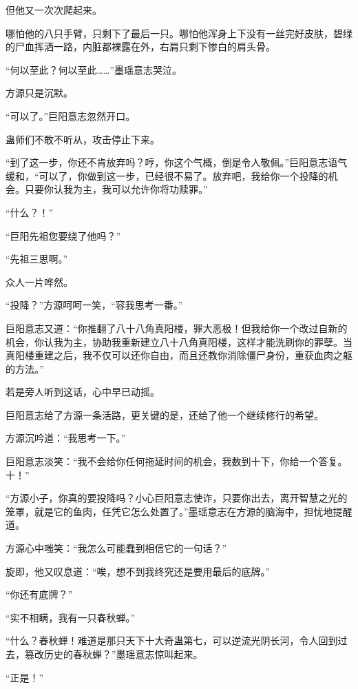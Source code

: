 \begin{this_body}
但他又一次次爬起来。

哪怕他的八只手臂，只剩下了最后一只。哪怕他浑身上下没有一丝完好皮肤，碧绿的尸血挥洒一路，内脏都裸露在外，右肩只剩下惨白的肩头骨。

“何以至此？何以至此……”墨瑶意志哭泣。

方源只是沉默。

“可以了。”巨阳意志忽然开口。

蛊师们不敢不听从，攻击停止下来。

“到了这一步，你还不肯放弃吗？哼，你这个气概，倒是令人敬佩。”巨阳意志语气缓和，“可以了，你做到这一步，已经很不易了。放弃吧，我给你一个投降的机会。只要你认我为主，我可以允许你将功赎罪。”

“什么？！”

“巨阳先祖您要绕了他吗？”

“先祖三思啊。”

众人一片哗然。

“投降？”方源呵呵一笑，“容我思考一番。”

巨阳意志又道：“你推翻了八十八角真阳楼，罪大恶极！但我给你一个改过自新的机会，你认我为主，协助我重新建立八十八角真阳楼，这样才能洗刷你的罪孽。当真阳楼重建之后，我不仅可以还你自由，而且还教你消除僵尸身份，重获血肉之躯的方法。”

若是旁人听到这话，心中早已动摇。

巨阳意志给了方源一条活路，更关键的是，还给了他一个继续修行的希望。

方源沉吟道：“我思考一下。”

巨阳意志淡笑：“我不会给你任何拖延时间的机会，我数到十下，你给一个答复。十！”

“方源小子，你真的要投降吗？小心巨阳意志使诈，只要你出去，离开智慧之光的笼罩，就是它的鱼肉，任凭它怎么处置了。”墨瑶意志在方源的脑海中，担忧地提醒道。

方源心中嗤笑：“我怎么可能蠢到相信它的一句话？”

旋即，他又叹息道：“唉，想不到我终究还是要用最后的底牌。”

“你还有底牌？”

“实不相瞒，我有一只春秋蝉。”

“什么？春秋蝉！难道是那只天下十大奇蛊第七，可以逆流光阴长河，令人回到过去，篡改历史的春秋蝉？”墨瑶意志惊叫起来。

“正是！”

\end{this_body}

